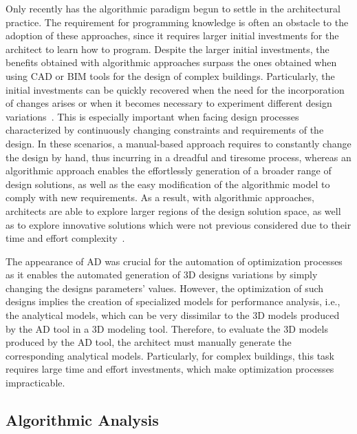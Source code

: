 Only recently has the algorithmic paradigm begun to settle in the architectural practice. The requirement for programming knowledge is often an obstacle to the adoption of these approaches, since it requires larger initial investments for the architect to learn how to program. Despite the larger initial investments, the benefits obtained with algorithmic approaches surpass the ones obtained when using \ac{CAD} or \ac{BIM} tools for the design of complex buildings. Particularly, the initial investments can be quickly recovered when the need for the incorporation of changes arises or when it becomes necessary to experiment different design variations~\cite{Leitao2014GD}. This is especially important when facing design processes characterized by continuously changing constraints and requirements of the design. In these scenarios, a manual-based approach requires to constantly change the design by hand, thus incurring in a dreadful and tiresome process, whereas an algorithmic approach enables the effortlessly generation of a broader range of design solutions, as well as the easy modification of the algorithmic model to comply with new requirements. As a result, with algorithmic approaches, architects are able to explore larger regions of the design solution space, as well as to explore innovative solutions which were not previous considered due to their time and effort complexity~\cite{Leitao2014GD}. 

The appearance of \ac{AD} was crucial for the automation of optimization processes as it enables the automated generation of  3D designs variations by simply changing the designs parameters' values. However, the optimization of such designs implies the creation of specialized models for performance analysis, i.e., the analytical models, which can be very dissimilar to the 3D models produced by the \ac{AD} tool in a 3D modeling tool. Therefore, to evaluate the 3D models produced by the \ac{AD} tool, the architect must manually generate the corresponding analytical models. Particularly, for complex buildings, this task requires large time and effort investments, which  make optimization processes impracticable.

\subsection{Algorithmic Analysis}

